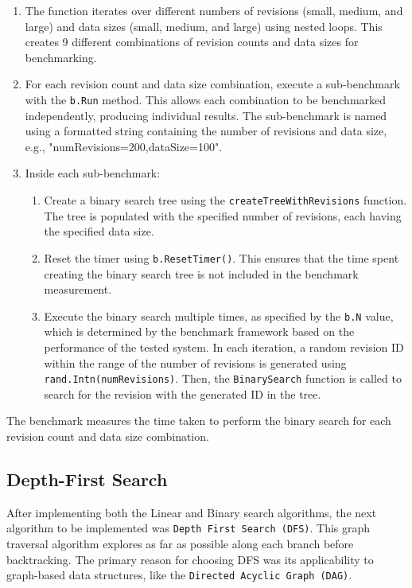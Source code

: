 \begin{enumerate}
	\item The function iterates over different numbers of revisions (small, medium, and large) and data sizes (small, medium, and large) using nested loops. This creates 9 different combinations of revision counts and data sizes for benchmarking.
	\item For each revision count and data size combination, execute a sub-benchmark with the \lstinline{b.Run} method. This allows each combination to be benchmarked independently, producing individual results. The sub-benchmark is named using a formatted string containing the number of revisions and data size, e.g., "numRevisions=200,dataSize=100".
	\item Inside each sub-benchmark:
	      \begin{enumerate}
		      \item Create a binary search tree using the \lstinline{createTreeWithRevisions} function. The tree is populated with the specified number of revisions, each having the specified data size.
		      \item Reset the timer using \lstinline{b.ResetTimer()}. This ensures that the time spent creating the binary search tree is not included in the benchmark measurement.
		      \item Execute the binary search multiple times, as specified by the \lstinline{b.N} value, which is determined by the benchmark framework based on the performance of the tested system. In each iteration, a random revision ID within the range of the number of revisions is generated using \lstinline{rand.Intn(numRevisions)}. Then, the \lstinline{BinarySearch} function is called to search for the revision with the generated ID in the tree.
	      \end{enumerate}
\end{enumerate}
The benchmark measures the time taken to perform the binary search for each revision count and data size combination.

\subsection{Depth-First Search}
After implementing both the Linear and Binary search algorithms, the next algorithm to be implemented was \lstinline{Depth First Search (DFS)}. This graph traversal algorithm explores as far as possible along each branch before backtracking. The primary reason for choosing DFS was its applicability to graph-based data structures, like the \lstinline{Directed Acyclic Graph (DAG)}.

